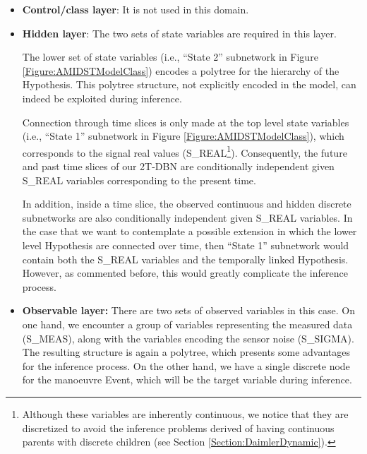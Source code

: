 \begin{itemize}

\item \textbf{Control/class layer}: It is not used in this domain.

\item \textbf{Hidden layer}: The two sets of state variables are required in this layer. 

The lower set of state variables (i.e., ``State 2'' subnetwork in Figure \ref{Figure:AMIDSTModelClass}) encodes a polytree \cite{JensenNielsen2007} for the hierarchy of the Hypothesis. This polytree structure, not explicitly encoded in the model, can indeed be exploited during inference.

Connection through time slices is only made at the top level state variables (i.e., ``State 1'' subnetwork in Figure \ref{Figure:AMIDSTModelClass}), which corresponds to the signal real values (S\_REAL\footnote{Although these variables are inherently continuous, we notice that they are discretized to avoid the inference problems derived of having continuous parents with discrete children (see Section \ref{Section:DaimlerDynamic}).}). Consequently, the future and past time slices of our 2T-DBN are conditionally independent given S\_REAL variables corresponding to the present time. 

In addition, inside a time slice, the observed continuous and hidden discrete subnetworks are also conditionally independent given S\_REAL variables. In the case that we want to contemplate a possible extension in which the lower level Hypothesis are connected over time, then ``State 1'' subnetwork would contain both the S\_REAL variables and the temporally linked Hypothesis. However, as commented before, this would greatly complicate the inference process. 

\item \textbf{Observable layer:} There are two sets of observed variables in this case. On one hand, we encounter a group of variables representing the measured data (S\_MEAS), along with the variables encoding the sensor noise (S\_SIGMA). The resulting structure is again a polytree, which presents some advantages for the inference process. On the other hand, we have a single discrete node for the manoeuvre Event, which will be the target variable during inference. 

\end{itemize}

